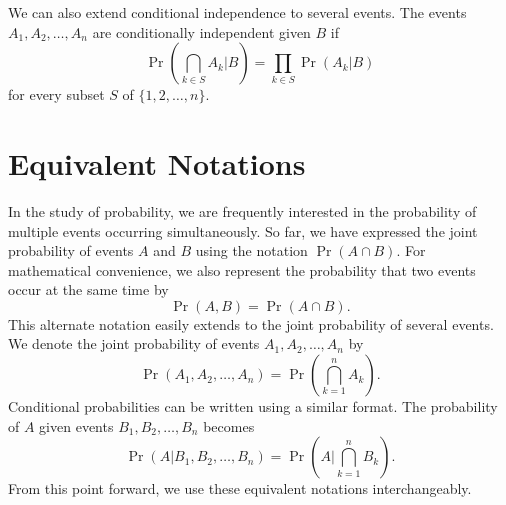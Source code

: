 We can also extend conditional independence to several events.
The events $A_1, A_2, \ldots, A_n$ are conditionally independent given $B$ if
\begin{equation*}
\Pr \left( \bigcap_{k \in S} A_k \Big| B \right)
= \prod_{k \in S} \Pr (A_k | B)
\end{equation*}
for every subset $S$ of $\{1, 2, \ldots, n\}$.


\section{Equivalent Notations}

In the study of probability, we are frequently interested in the probability of multiple events occurring simultaneously.
So far, we have expressed the joint probability of events $A$ and $B$ using the notation $\Pr (A \cap B)$.
For mathematical convenience, we also represent the probability that two events occur at the same time by
\begin{equation*}
\Pr (A, B) = \Pr (A \cap B) .
\end{equation*}
This alternate notation easily extends to the joint probability of several events.
We denote the joint probability of events $A_1, A_2, \ldots, A_n$ by
\begin{equation*}
\Pr (A_1, A_2, \ldots, A_n) =
\Pr \left( \bigcap_{k=1}^n A_k \right) .
\end{equation*}
Conditional probabilities can be written using a similar format.
The probability of $A$ given events $B_1, B_2, \ldots, B_n$ becomes
\begin{equation*}
\Pr (A | B_1, B_2, \ldots, B_n) =
\Pr \left( A \bigg| \bigcap_{k=1}^n B_k \right) .
\end{equation*}
From this point forward, we use these equivalent notations interchangeably.
